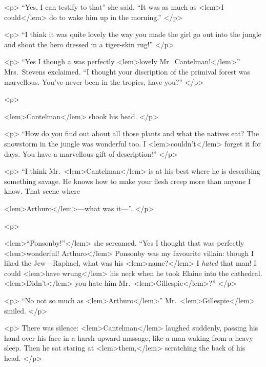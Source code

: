 {{				<p>
				“Yes, I can testify to that” she said. “It was as much as 
<lem>I could</lem>
					{} 
				do to wake 
				him up in the morning.” 
 				</p> 

				<p>
				“I think it was quite lovely the way you made the girl go out into the jungle 
				and shoot the hero dressed in a tiger-skin rug!” 
 				</p> 

				<p>
				“Yes I though a was perfectly 
<lem>lovely Mr.\ Cantelman!</lem>{}” 
				Mrs.\ Stevens exclaimed. “I thought 
				your discription of the primival forest was marvellous. You've never been 
				in the tropics, have you?” 
 				</p> 

				<p>
				
<lem>Cantelman</lem>{} shook his head. 
 				</p> 

				<p>
				“How do you find out about all those plants and what the natives eat? The 
				snowstorm in the jungle was wonderful too. I 
<lem>couldn't</lem>
					{} 
				forget it for days. 
				You have a marvellous gift of description!” 
 				</p> 

				<p>
				“I think Mr.\ 
<lem>Cantelman</lem>{} is at his best where he is describing something savage. 
				He knows how to make your flesh creep more than anyone I know. That scene where 
				
<lem>Arthuro</lem>{}---what was it---”.
				</p>  

				<p>
				
<lem>“Ponsonby!”</lem>
					{} 
				she screamed. “Yes I thought that was 
				perfectly 
<lem>wonderful! Arthuro</lem>
					{} 
				Ponsonby was my favourite villain: though I liked 
				the Jew---Raphael, what was his 
<lem>name?</lem> 
					{}
				I \emph{hated} that man! I could 
<lem>have wrung</lem>
					{} 
				his neck 
				when he took Elaine into the cathedral. 
<lem>Didn't</lem>
					{} 
				you hate him Mr.\ 
<lem>Gillespie</lem>{}?” 
				</p> 

				<p>
“No not so much as 
<lem>Arthuro</lem>{}” Mr.\ 
<lem>Gillespie</lem>
					{} 
				smiled. 
 				</p> 

				<p>
				There was silence: 
<lem>Cantelman</lem>{} laughed suddenly, passing his hand over his 
				face in a harsh upward massage, like a man waking from a heavy sleep. Then 
				he sat staring at 
<lem>them,</lem>
					{\Bfootnote{them}} 
				scratching the back of his head. 
 				</p> 

}}
